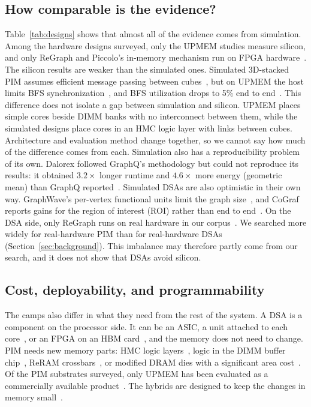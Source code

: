 \documentclass[journal,onecolumn]{IEEEtran}
\begin{document}
\subsection{How comparable is the evidence?}
Table~\ref{tab:designs} shows that almost all of the evidence comes from simulation. Among the hardware designs surveyed, only the UPMEM studies measure silicon, and only ReGraph and Piccolo's in-memory mechanism run on FPGA hardware~\cite{gomezluna2022prim,cai2024pimpam,barkhordar2025alphapim,asquini2025tc,chen2022regraph,shin2025piccolo}. The silicon results are weaker than the simulated ones. Simulated 3D-stacked PIM assumes efficient message passing between cubes~\cite{ahn2015tesseract,zhuo2019graphq}, but on UPMEM the host limits BFS synchronization~\cite{gomezluna2022prim}, and BFS utilization drops to 5\% end to end~\cite{barkhordar2025alphapim}. This difference does not isolate a gap between simulation and silicon. UPMEM places simple cores beside DIMM banks with no interconnect between them, while the simulated designs place cores in an HMC logic layer with links between cubes. Architecture and evaluation method change together, so we cannot say how much of the difference comes from each. Simulation also has a reproducibility problem of its own. Dalorex followed GraphQ's methodology but could not reproduce its results: it obtained $3.2\times$ longer runtime and $4.6\times$ more energy (geometric mean) than GraphQ reported~\cite{orenesvera2023dalorex}. Simulated DSAs are also optimistic in their own way. GraphWave's per-vertex functional units limit the graph size~\cite{lee2022graphwave}, and CoGraf reports gains for the region of interest (ROI) rather than end to end~\cite{yenimol2026cograf}. On the DSA side, only ReGraph runs on real hardware in our corpus~\cite{chen2022regraph}. We searched more widely for real-hardware PIM than for real-hardware DSAs (Section~\ref{sec:background}). This imbalance may therefore partly come from our search, and it does not show that DSAs avoid silicon.

\subsection{Cost, deployability, and programmability}
The camps also differ in what they need from the rest of the system. A DSA is a component on the processor side. It can be an ASIC, a unit attached to each core~\cite{mukkara2018hats,zhao2022tdgraph}, or an FPGA on an HBM card~\cite{chen2022regraph}, and the memory does not need to change. PIM needs new memory parts: HMC logic layers~\cite{ahn2015tesseract}, logic in the DIMM buffer chip~\cite{talati2022ndminer}, ReRAM crossbars~\cite{song2018graphr}, or modified DRAM dies with a significant area cost~\cite{shin2025fala}. Of the PIM substrates surveyed, only UPMEM has been evaluated as a commercially available product~\cite{gomezluna2022prim}. The hybrids are designed to keep the changes in memory small~\cite{shin2025piccolo,shin2025fala}.
\end{document}
